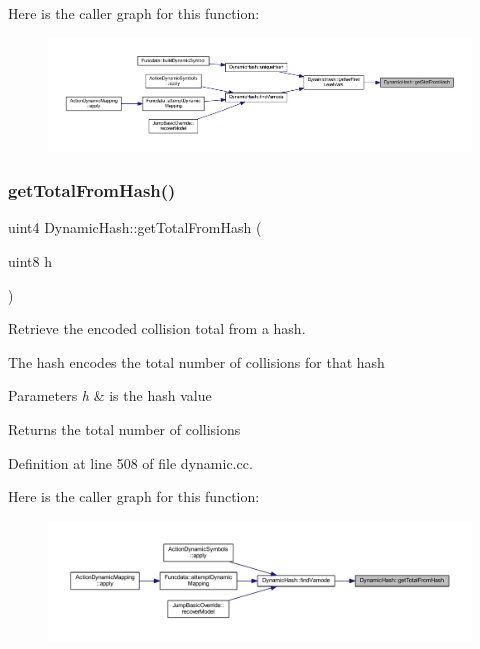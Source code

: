 Here is the caller graph for this function\+:
\nopagebreak
\begin{figure}[H]
\begin{center}
\leavevmode
\includegraphics[width=350pt]{class_dynamic_hash_ac5d5cb3b8c23327a82efe7f5f011fbbf_icgraph}
\end{center}
\end{figure}
\mbox{\label{class_dynamic_hash_a1776a0b6908b317435afca5d33954b44}} 
\subsubsection{\texorpdfstring{getTotalFromHash()}{getTotalFromHash()}}
{\footnotesize\ttfamily uint4 Dynamic\+Hash\+::get\+Total\+From\+Hash (\begin{DoxyParamCaption}\item[{uint8}]{h }\end{DoxyParamCaption})\hspace{0.3cm}{\ttfamily [static]}}



Retrieve the encoded collision total from a hash. 

The hash encodes the total number of collisions for that hash 
\begin{DoxyParams}{Parameters}
{\em h} & is the hash value \\
\hline
\end{DoxyParams}
\begin{DoxyReturn}{Returns}
the total number of collisions 
\end{DoxyReturn}


Definition at line 508 of file dynamic.\+cc.

Here is the caller graph for this function\+:
\nopagebreak
\begin{figure}[H]
\begin{center}
\leavevmode
\includegraphics[width=350pt]{class_dynamic_hash_a1776a0b6908b317435afca5d33954b44_icgraph}
\end{center}
\end{figure}
\mbox{\label{class_dynamic_hash_a9255e5fffe4408f9e3f84a3f0847527e}} 
